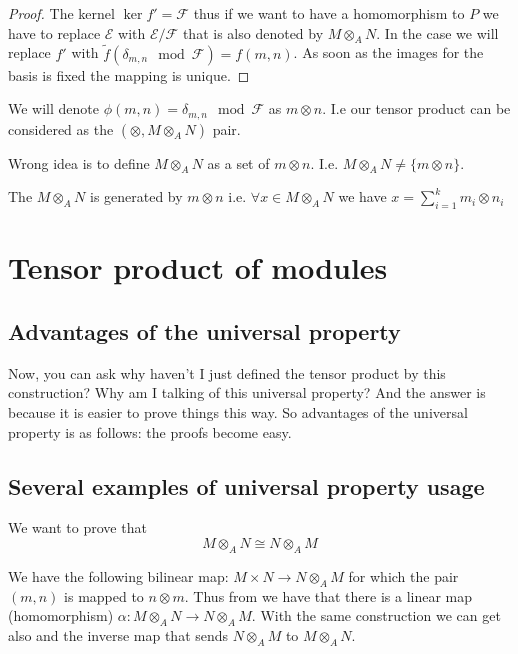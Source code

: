 \begin{lemma}
\begin{proof}
    The kernel $\ker f' = \mathcal{F}$ thus if we want to have a
    homomorphism to $P$ we have to replace $\mathcal{E}$ with
    $\mathcal{E}/\mathcal{F}$ that is also denoted by
    $M \otimes_A N$. In the case we will replace $f'$ with
    $\tilde{f}\left(\delta_{m,n} \mod \mathcal{F}\right) = f(m,n)$. As
    soon as the images for the basis is fixed the mapping is unique.
  \end{proof}
  \label{lem:tensorproductexistence}
\end{lemma}

We will denote $\phi\left(m,n\right) = \delta_{m,n} \mod \mathcal{F}$ as
$m \otimes n$. I.e our tensor product can be considered as the 
$\left(\otimes, M \otimes_A N\right)$ pair.


\begin{remark}
  Wrong idea is to define $M \otimes_A N$
  as a set of $m \otimes n$. I.e.
  $M \otimes_A N \neq \{m \otimes n\}$.
\end{remark}
The $M \otimes_A N$ is generated by $m \otimes n$ i.e.
$\forall x \in M \otimes_A N$ we have $x = \sum_{i = 1}^k m_i \otimes n_i$

\section{Tensor product of modules}

\subsection{Advantages of the universal property}
Now, you can ask  why haven't I just defined the tensor product by
this construction? Why am I talking of this universal property? 
And the answer is because it is easier to prove things this way. 
So advantages of the universal property is as follows: the proofs
become easy.

\subsection{Several examples of universal property usage}

\begin{example}
  We want to prove that
  \[
  M \otimes_A N \cong N \otimes_A M
  \]

  We have the following bilinear map:
  $M \times N \to N \otimes_A M$ for which the pair
  $(m,n)$ is mapped to $n \otimes m$. Thus from
   we have that there is a linear map
  (homomorphism)
  $\alpha: M \otimes_A N \to N \otimes_A M$. With the same
  construction we can get also and the inverse map that sends
  $N \otimes_A M$ to $M \otimes_A N$.
\end{example}

